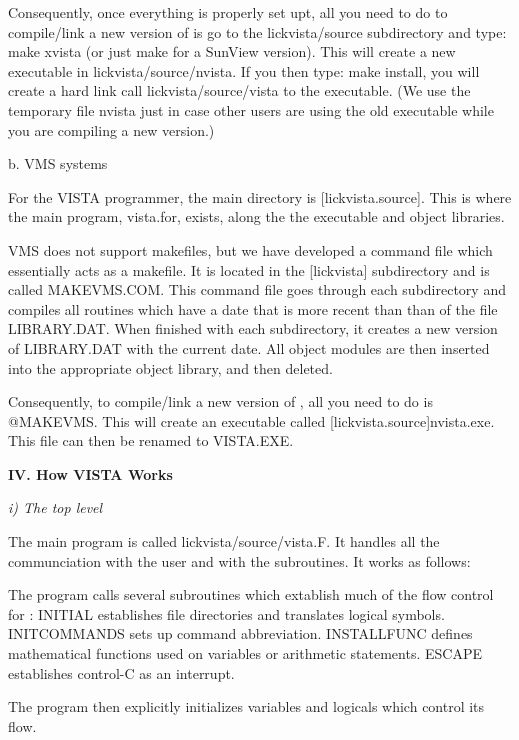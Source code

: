 	Consequently, once everything is properly set upt,
all you need to do to compile/link a new version of \V
is go to the lickvista/source subdirectory and type: make xvista
(or just make for a SunView version). This will create a new executable
in lickvista/source/nvista.  If you then type: make install, you will
create a hard link call lickvista/source/vista to the executable. (We
use the temporary file nvista just in case other users are using the
old executable while you are compiling a new version.)

\centerline{b. VMS systems}

	For the VISTA programmer, the main directory is [lickvista.source].
This is where the main program, vista.for, exists, along the the
executable and object libraries.

	VMS does not support makefiles, but we have developed a command
file which essentially acts as a makefile.  It is located in the 
[lickvista] subdirectory and is called MAKEVMS.COM.  This command file 
goes through each subdirectory and compiles all routines which have a date
that is more recent than than of the file LIBRARY.DAT. When finished with
each subdirectory, it creates a new version of LIBRARY.DAT with the current
date.  All object modules are then inserted into the appropriate object
library, and then deleted.

	Consequently, to compile/link a new version of \V, all you need
to do is @MAKEVMS.  This will create an executable called 
[lickvista.source]nvista.exe.   This file can then be renamed to VISTA.EXE.

\Sskip
\centerline {\bf IV.  How VISTA Works\rm}

\Sskip
\centerline {\it i) The top level\rm}

\vskip 0.125in
	The main program is called lickvista/source/vista.F.  It
handles all the communciation with the user and with the subroutines.
It works as follows: 

\hang 
{}The program calls several subroutines which
extablish much of the flow control for \Vns : INITIAL establishes file
directories and translates logical symbols.  INITCOMMANDS sets up command
abbreviation.  INSTALLFUNC defines mathematical functions used on variables or
arithmetic statements.  ESCAPE establishes control-C as an interrupt. 

\hang
{}The program then explicitly initializes
variables and logicals which control its flow. 


